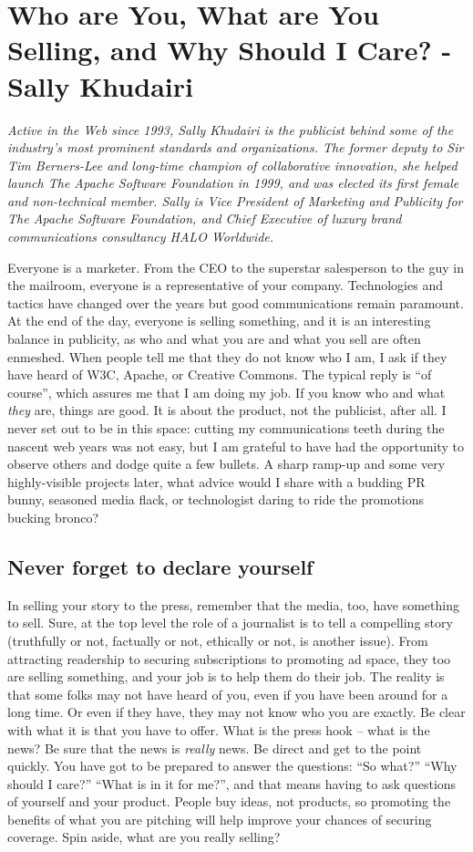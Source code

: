\chapter{Who are You, What are You Selling, and Why Should I Care? - Sally Khudairi}

\textit{Active in the Web since 1993, Sally Khudairi is the publicist behind
some of the industry's most prominent standards and organizations. The former
deputy to Sir Tim Berners-Lee and long-time champion of collaborative
innovation, she helped launch The Apache Software Foundation in 1999, and was
elected its first female and non-technical member. Sally is Vice President of
Marketing and Publicity for The Apache Software Foundation, and Chief Executive
of luxury brand communications consultancy HALO Worldwide.}

Everyone is a marketer. From the CEO to the superstar salesperson to the guy in
the mailroom, everyone is a representative of your company. Technologies and
tactics have changed over the years but good communications remain paramount. At
the end of the day, everyone is selling something, and it is an interesting
balance in publicity, as who and what you are and what you sell are often
enmeshed. When people tell me that they do not know who I am, I ask if they have
heard of W3C, Apache, or Creative Commons. The typical reply is ``of course'',
which assures me that I am doing my job. If you know who and what \textit{they} are,
things are good. It is about the product, not the publicist, after all. I never
set out to be in this space: cutting my communications teeth during the nascent
web years was not easy, but I am grateful to have had the opportunity to observe
others and dodge quite a few bullets. A sharp ramp-up and some very
highly-visible projects later, what advice would I share with a budding PR bunny,
seasoned media flack, or technologist daring to ride the promotions bucking bronco?

\section*{Never forget to declare yourself}
In selling your story to the press, remember that the media, too, have something
to sell. Sure, at the top level the role of a journalist is to tell a compelling
story (truthfully or not, factually or not, ethically or not, is another issue).
From attracting readership to securing subscriptions to promoting ad space, they
too are selling something, and your job is to help them do their job. The
reality is that some folks may not have heard of you, even if you have been around
for a long time. Or even if they have, they may not know who you are exactly. Be
clear with what it is that you have to offer. What is the press hook -- what is
the news? Be sure that the news is \textit{really} news. Be direct and get to the point
quickly. You have got to be prepared to answer the questions: ``So what?'' ``Why
should I care?'' ``What is in it for me?'', and that means having to ask questions
of yourself and your product. People buy ideas, not products, so promoting the
benefits of what you are pitching will help improve your chances of securing coverage.
Spin aside, what are you really selling?

